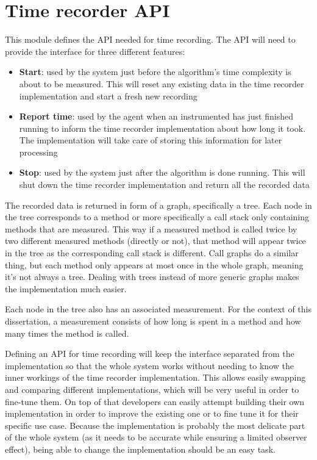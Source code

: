 \section{Time recorder API}
This module defines the API needed for time recording. The API will need to provide the interface for three different features:
\begin{itemize}
  \item \textbf{Start}: used by the system just before the algorithm's time complexity is about to be measured. This will reset any existing data in the time recorder implementation and start a fresh new recording
  \item \textbf{Report time}: used by the agent when an instrumented has just finished running to inform the time recorder implementation about how long it took. The implementation will take care of storing this information for later processing
  \item \textbf{Stop}: used by the system just after the algorithm is done running. This will shut down the time recorder implementation and return all the recorded data
\end{itemize}

\noindent The recorded data is returned in form of a graph, specifically a tree. Each node in the tree corresponds to a method or more specifically a call stack only containing methods that are measured. This way if a measured method is called twice by two different measured methods (directly or not), that method will appear twice in the tree as the corresponding call stack is different. Call graphs \cite{GKM00} do a similar thing, but each method only appears at most once in the whole graph, meaning it's not always a tree. Dealing with trees instead of more generic graphs makes the implementation much easier.

\noindent Each node in the tree also has an associated measurement. For the context of this dissertation, a measurement consists of how long is spent in a method and how many times the method is called.

\noindent Defining an API for time recording will keep the interface separated from the implementation so that the whole system works without needing to know the inner workings of the time recorder implementation. This allows easily swapping and comparing different implementations, which will be very useful in order to fine-tune them. On top of that developers can easily attempt building their own implementation in order to improve the existing one or to fine tune it for their specific use case. Because the implementation is probably the most delicate part of the whole system (as it needs to be accurate while ensuring a limited observer effect), being able to change the implementation should be an easy task.

